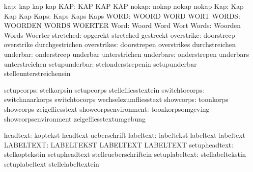                           kap:  kap                          kap
                                kap
                          KAP:  KAP                          KAP
                                KAP
                        nokap:  nokap                        nokap
                                nokap
                          Kap:  Kap                          Kap
                                Kap
                         Kaps:  Kaps                         Kaps
                                Kaps
                         WORD:  WOORD                        WORD
                                WORT
                        WORDS:  WOORDEN                      WORDS
                                WOERTER
                         Word:  Woord                        Word
                                Wort
                        Words:  Woorden                      Words
                                Woerter
                    stretched:  opgerekt                     stretched
                                gestreckt
                   overstrike:  doorstreep                   overstrike
                                durchgestrichen
                  overstrikes:  doorstrepen                  overstrikes
                                durchstreichen
                     underbar:  onderstreep                  underbar
                                unterstrichen
                    underbars:  onderstrepen                 underbars
                                unterstreichen
                setupunderbar:  stelonderstrepenin           setupunderbar
                                stelleunterstreichenein

                   setupcorps:  stelkorpsin                  setupcorps
                                stellefliesstextein
                switchtocorps:  switchnaarkorps              switchtocorps
                                wechselezumfliesstext
                    showcorps:  toonkorps                    showcorps
                                zeigefliesstext
         showcorpsenvironment:  toonkorpsomgeving            showcorpsenvironment
                                zeigefliesstextumgebung

                     headtext:  koptekst                     headtext
                                ueberschrift
                    labeltext:  labeltekst                   labeltext
                                labeltext
                    LABELTEXT:  LABELTEKST                   LABELTEXT
                                LABELTEXT
                setupheadtext:  stelkoptekstin               setupheadtext
                                stelleueberschriftein
               setuplabeltext:  stellabeltekstin             setuplabeltext
                                stellelabeltextein

